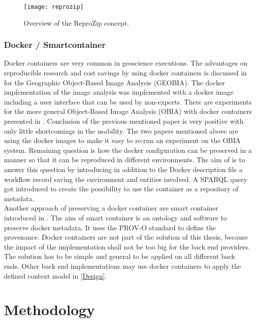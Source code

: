 \documentclass[draft,final]{vutinfth} %
\begin{document}
\begin{figure}[h]
	\centering
	\texttt{[image: reprozip]}
	\caption{Overview of the ReproZip concept. \cite{29c5846926a4497d95f276604cb0368c}}
	\label{fig:reprozip} %
\end{figure}

\subsection{Docker / Smartcontainer}\label{Smartcontainer}
Docker containers are very common in geoscience executions. The advantages on reproducible research and cost savings by using docker containers is discussed in \cite{rs9030290} for the Geographic Object-Based Image Analysis (GEOBIA). The docker implementation of the image analysis was implemented with a docker image including a user interface that can be used by non-experts. There are experiments for the more general Object-Based Image Analysis (OBIA) with docker containers presented in \cite{proceedings456}. Conclusion of the previous mentioned paper is very positive with only little shortcomings in the usability. The two papers mentioned above are using the docker images to make it easy to re-run an experiment on the OBIA system. Remaining question is how the docker configuration can be preserved in a manner so that it can be reproduced in different environments. The aim of \cite{emsley2017a} is to answer this question by introducing in addition to the Docker description file a workflow record saving the environment and entities involved. A SPARQL query got introduced to create the possibility to use the container as a repository of metadata.\\ 
Another approach of preserving a docker container are smart container introduced in \cite{Huo2015SmartCA}. The aim of smart container is an ontology and software to preserve docker metadata. It uses the PROV-O standard to define the provenance. 
Docker containers are not part of the solution of this thesis, because the impact of the implementation shall not be too big for the back end providers. The solution has to be simple and general to be applied on all different back ends. Other back end implementations may use docker containers to apply the defined context model in \ref{Design}.

\chapter{Methodology}\label{Methodology}
\end{document}
